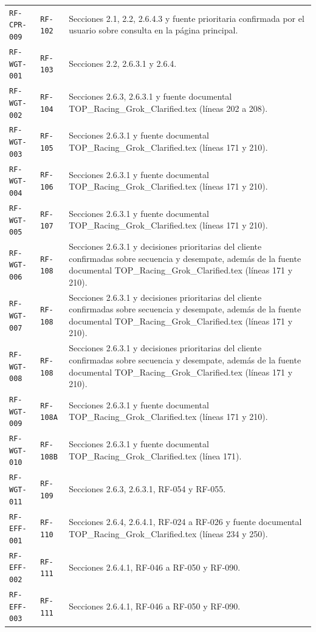 \documentclass[10pt,letterpaper]{article}
\begin{document}
\begin{landscape}
\begin{longtable}{P{2.7cm}P{2.6cm}P{15.7cm}}
\texttt{RF-CPR-009} & \texttt{RF-102} & Secciones 2.1, 2.2, 2.6.4.3 y fuente prioritaria confirmada por el usuario sobre consulta en la página principal.\\
\texttt{RF-WGT-001} & \texttt{RF-103} & Secciones 2.2, 2.6.3.1 y 2.6.4.\\
\texttt{RF-WGT-002} & \texttt{RF-104} & Secciones 2.6.3, 2.6.3.1 y fuente documental TOP\_Racing\_Grok\_Clarified.tex (líneas 202 a 208).\\
\texttt{RF-WGT-003} & \texttt{RF-105} & Secciones 2.6.3.1 y fuente documental TOP\_Racing\_Grok\_Clarified.tex (líneas 171 y 210).\\
\texttt{RF-WGT-004} & \texttt{RF-106} & Secciones 2.6.3.1 y fuente documental TOP\_Racing\_Grok\_Clarified.tex (líneas 171 y 210).\\
\texttt{RF-WGT-005} & \texttt{RF-107} & Secciones 2.6.3.1 y fuente documental TOP\_Racing\_Grok\_Clarified.tex (líneas 171 y 210).\\
\texttt{RF-WGT-006} & \texttt{RF-108} & Secciones 2.6.3.1 y decisiones prioritarias del cliente confirmadas sobre secuencia y desempate, además de la fuente documental TOP\_Racing\_Grok\_Clarified.tex (líneas 171 y 210).\\
\texttt{RF-WGT-007} & \texttt{RF-108} & Secciones 2.6.3.1 y decisiones prioritarias del cliente confirmadas sobre secuencia y desempate, además de la fuente documental TOP\_Racing\_Grok\_Clarified.tex (líneas 171 y 210).\\
\texttt{RF-WGT-008} & \texttt{RF-108} & Secciones 2.6.3.1 y decisiones prioritarias del cliente confirmadas sobre secuencia y desempate, además de la fuente documental TOP\_Racing\_Grok\_Clarified.tex (líneas 171 y 210).\\
\texttt{RF-WGT-009} & \texttt{RF-108A} & Secciones 2.6.3.1 y fuente documental TOP\_Racing\_Grok\_Clarified.tex (líneas 171 y 210).\\
\texttt{RF-WGT-010} & \texttt{RF-108B} & Secciones 2.6.3.1 y fuente documental TOP\_Racing\_Grok\_Clarified.tex (línea 171).\\
\texttt{RF-WGT-011} & \texttt{RF-109} & Secciones 2.6.3, 2.6.3.1, RF-054 y RF-055.\\
\texttt{RF-EFF-001} & \texttt{RF-110} & Secciones 2.6.4, 2.6.4.1, RF-024 a RF-026 y fuente documental TOP\_Racing\_Grok\_Clarified.tex (líneas 234 y 250).\\
\texttt{RF-EFF-002} & \texttt{RF-111} & Secciones 2.6.4.1, RF-046 a RF-050 y RF-090.\\
\texttt{RF-EFF-003} & \texttt{RF-111} & Secciones 2.6.4.1, RF-046 a RF-050 y RF-090.\\

\end{longtable}
\end{landscape}
\end{document}
